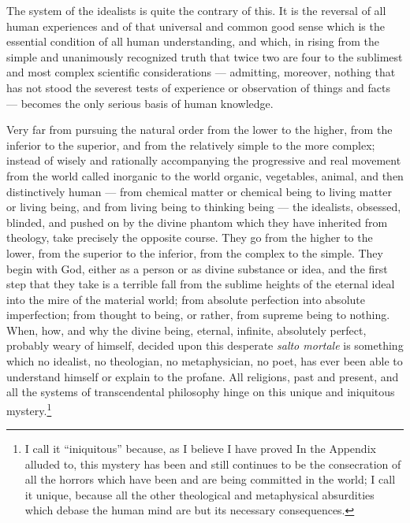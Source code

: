 \documentclass[12pt]{report}
\begin{document}
The system of the idealists is quite the contrary of this. It is the reversal of all human experiences and of that universal and common good sense which is the essential condition of all human understanding, and which, in rising from the simple and unanimously recognized truth that twice two are four to the sublimest and most complex scientific considerations — admitting, moreover, nothing that has not stood the severest tests of experience or observation of things and facts — becomes the only serious basis of human knowledge.


Very far from pursuing the natural order from the lower to the higher, from the inferior to the superior, and from the relatively simple to the more complex; instead of wisely and rationally accompanying the progressive and real movement from the world called inorganic to the world organic, vegetables, animal, and then distinctively human — from chemical matter or chemical being to living matter or living being, and from living being to thinking being — the idealists, obsessed, blinded, and pushed on by the divine phantom which they have inherited from theology, take precisely the opposite course. They go from the higher to the lower, from the superior to the inferior, from the complex to the simple. They begin with God, either as a person or as divine substance or idea, and the first step that they take is a terrible fall from the sublime heights of the eternal ideal into the mire of the material world; from absolute perfection into absolute imperfection; from thought to being, or rather, from supreme being to nothing. When, how, and why the divine being, eternal, infinite, absolutely perfect, probably weary of himself, decided upon this desperate\emph{ salto mortale} is something which no idealist, no theologian, no metaphysician, no poet, has ever been able to understand himself or explain to the profane. All religions, past and present, and all the systems of transcendental philosophy hinge on this unique and iniquitous mystery.\footnote{I call it “iniquitous” because, as I believe I have proved In the Appendix alluded to, this mystery has been and still continues to be the consecration of all the horrors which have been and are being committed in the world; I call it unique, because all the other theological and metaphysical absurdities which debase the human mind are but its necessary consequences.}
\end{document}
